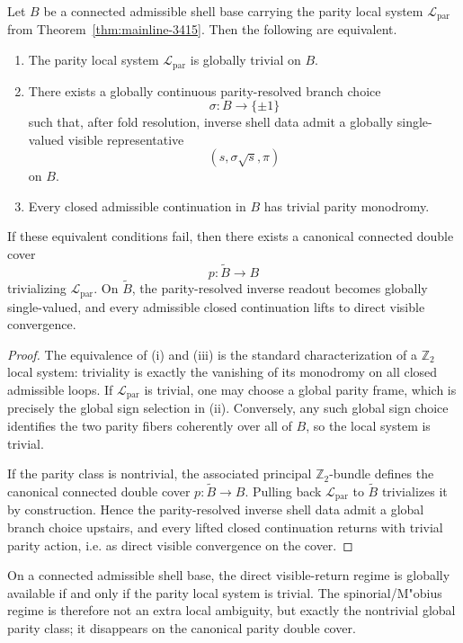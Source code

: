 \begin{theorem}
\label{thm:mainline-3416}
Let $B$ be a connected admissible shell base carrying the parity local system $\mathcal L_{\mathrm{par}}$ from Theorem~\ref{thm:mainline-3415}. Then the following are equivalent.
\begin{enumerate}[label=(\roman*)]
  \item The parity local system $\mathcal L_{\mathrm{par}}$ is globally trivial on $B$.
  \item There exists a globally continuous parity-resolved branch choice
  \[
    \sigma:B\to\{\pm 1\}
  \]
  such that, after fold resolution, inverse shell data admit a globally single-valued visible representative
  \[
    (s,\sigma\sqrt{s},\pi)
  \]
  on $B$.
  \item Every closed admissible continuation in $B$ has trivial parity monodromy.
\end{enumerate}
If these equivalent conditions fail, then there exists a canonical connected double cover
\[
  p:\widetilde B\to B
\]
trivializing $\mathcal L_{\mathrm{par}}$. On $\widetilde B$, the parity-resolved inverse readout becomes globally single-valued, and every admissible closed continuation lifts to direct visible convergence.
\end{theorem}

\begin{proof}
The equivalence of (i) and (iii) is the standard characterization of a $\mathbb Z_2$ local system: triviality is exactly the vanishing of its monodromy on all closed admissible loops. If $\mathcal L_{\mathrm{par}}$ is trivial, one may choose a global parity frame, which is precisely the global sign selection in (ii). Conversely, any such global sign choice identifies the two parity fibers coherently over all of $B$, so the local system is trivial.

If the parity class is nontrivial, the associated principal $\mathbb Z_2$-bundle defines the canonical connected double cover $p:\widetilde B\to B$. Pulling back $\mathcal L_{\mathrm{par}}$ to $\widetilde B$ trivializes it by construction. Hence the parity-resolved inverse shell data admit a global branch choice upstairs, and every lifted closed continuation returns with trivial parity action, i.e. as direct visible convergence on the cover.
\end{proof}

\begin{corollary}
\label{cor:mainline-3416}
On a connected admissible shell base, the direct visible-return regime is globally available if and only if the parity local system is trivial. The spinorial/M"obius regime is therefore not an extra local ambiguity, but exactly the nontrivial global parity class; it disappears on the canonical parity double cover.
\end{corollary}

